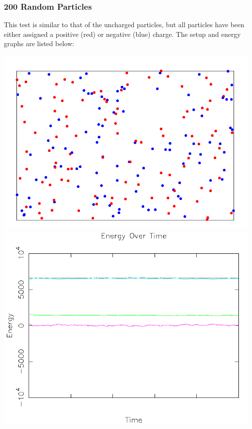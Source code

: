 \documentclass{article}
\begin{document}
\subsubsection{200 Random Particles}
This test is similar to that of the uncharged particles,
but all particles have been either assigned a positive (red) or negative (blue) charge.
The setup and energy graphs are listed below:
\\
\begin{center}
    \includegraphics[scale=0.5]{charged_random}
    \includegraphics[scale=0.5]{charged_random_energy}
\end{center}
\end{document}
